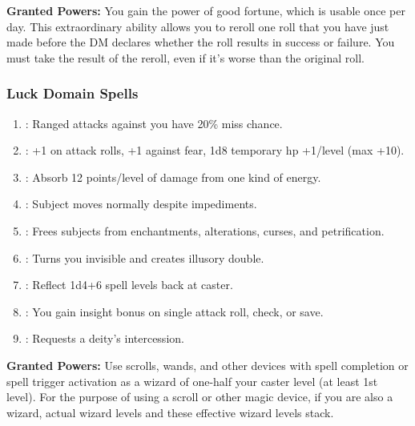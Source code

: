 \textbf{Granted Powers:} You gain the power of good fortune, which is usable once per day. This extraordinary ability allows you to reroll one roll that you have just made before the DM declares whether the roll results in success or failure. You must take the result of the reroll, even if it’s worse than the original roll.
\subsubsection{Luck Domain Spells}
\begin{enumerate}
	\item{:} Ranged attacks against you have 20\% miss chance.
	\item{:} +1 on attack rolls, +1 against fear, 1d8 temporary hp +1/level (max +10).
	\item{:} Absorb 12 points/level of damage from one kind of energy.
	\item{:} Subject moves normally despite impediments.
	\item{:} Frees subjects from enchantments, alterations, curses, and petrification.
	\item{:} Turns you invisible and creates illusory double.
	\item{:} Reflect 1d4+6 spell levels back at caster.
	\item{:} You gain insight bonus on single attack roll, check, or save.
	\item{:} Requests a deity’s intercession.
\end{enumerate}

\textbf{Granted Powers:} Use scrolls, wands, and other devices with spell completion or spell trigger activation as a wizard of one-half your caster level (at least 1st level). For the purpose of using a scroll or other magic device, if you are also a wizard, actual wizard levels and these effective wizard levels stack.
